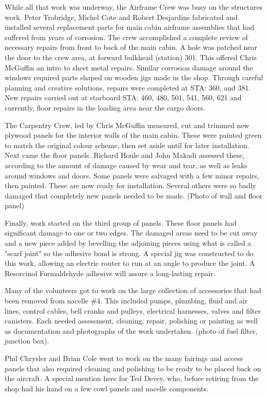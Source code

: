 While all that work was underway, the Airframe Crew was busy on the
structures work.  Peter Trobridge, Michel Cote and Robert Desjardins
fabricated and installed several replacement parts for main cabin
airframe assemblies that had suffered from years of corrosion.  The
crew accomplished a complete review of necessary repairs from front to
back of the main cabin. A hole was patched near the door to the crew
area, at forward bulkhead (station) 301. This offered Chris McGuffin an
intro to sheet metal repairs. Similar corrosion damage around the
windows required parts shaped on wooden jigs made in the shop. Through
careful planning and creative solutions, repairs were completed at STA:
360, and 381. New repairs carried out at starboard STA: 460, 480, 501,
541, 560, 621 and currently, floor repairs in the loading area near the
cargo doors.

The Carpentry Crew, led by Chris McGuffin measured, cut and trimmed new
plywood panels for the interior walls of the main cabin.  These were
painted green to match the original colour scheme, then set aside until
for later installation.  Next came the floor panels.  Richard Houle and
John Makadi assessed these, according to the amount of damage caused by
wear and tear, as well as leaks around windows and doors.  Some panels
were salvaged with a few minor repairs, then painted. These are now
ready for installation.  Several others were so badly damaged that
completely new panels needed to be made. (Photo of wall and floor
panel)

Finally, work started on the third group of panels.  These floor panels
had significant damage to one or two edges.  The damaged areas need to
be cut away and a new piece added by bevelling the adjoining pieces
using what is called a "scarf joint" so the adhesive bond is strong.  A
special jig was constructed to do this work, allowing an electric
router to run at an angle to produce the joint. A Resorcinol
Formaldehyde adhesive will assure a long-lasting repair.

Many of the volunteers got to work on the large collection of
accessories that had been removed from nacelle \#4.  This included
pumps, plumbing, fluid and air lines, control cables, bell cranks and
pulleys, electrical harnesses, valves and filter canisters. Each needed
assessment, cleaning, repair, polishing or painting as well as
documentation and photographs of the work undertaken. (photo of fuel
filter, junction box).

Phil Chrysler and Brian Cole went to work on the many fairings and
access panels that also required cleaning and polishing to be ready to
be placed back on the aircraft. A special mention here for Ted Devey,
who, before retiring from the shop had his hand on a few cowl panels
and nacelle components.


